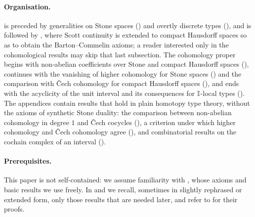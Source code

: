 \paragraph{Organisation.}  is
preceded by generalities on Stone spaces () and overtly
discrete types (), and is followed by
, where Scott continuity is extended to compact Hausdorff
spaces so as to obtain the Barton--Commelin axioms; a reader interested only in
the cohomological results may skip that last subsection. The cohomology proper
begins with non-abelian coefficients over Stone and compact Hausdorff spaces
(), continues with the vanishing of higher
cohomology for Stone spaces () and the comparison with
\v{C}ech cohomology for compact Hausdorff spaces (), and ends with the
acyclicity of the unit interval and its consequences for $\mathbb{I}$-local types
(). The appendices contain results that hold in plain
homotopy type theory, without the axioms of synthetic Stone duality: the
comparison between non-abelian cohomology in degree $1$ and \v{C}ech cocycles
(), a criterion under which higher cohomology and
\v{C}ech cohomology agree (), and combinatorial results on
the cochain complex of an interval ().

\paragraph{Prerequisites.} This paper is not self-contained: we assume
familiarity with \cite{synthetic-stone-duality}, whose axioms and basic results
we use freely. In  and  we recall,
sometimes in slightly rephrased or extended form, only those results that are
needed later, and refer to \cite{synthetic-stone-duality} for their proofs.
